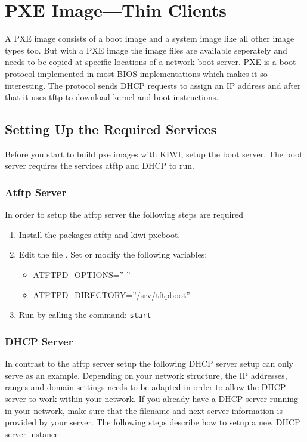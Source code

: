 \chapter{PXE Image---Thin Clients}
\label{chapter:pxe}
\minitoc

A PXE image consists of a boot image and a system image like all other
image types too. But with a PXE image the image files are available
seperately and needs to be copied at specific locations of a network
boot server. PXE is a boot protocol implemented in most BIOS implementations
which makes it so interesting. The protocol sends DHCP requests to assign
an IP address and after that it uses tftp to download kernel and boot
instructions. 

\section{Setting Up the Required Services}

Before you start to build pxe images with KIWI, setup the boot server. 
The boot server requires the services atftp and DHCP to run.

\subsection{Atftp Server}

In order to setup the atftp server the following steps are required

\begin{enumerate}
\item Install the packages atftp and kiwi-pxeboot.
\item Edit the file . Set or modify the following
      variables:
      \begin{itemize}
      \item ATFTPD\_OPTIONS='' ''
      \item ATFTPD\_DIRECTORY=''/srv/tftpboot''
      \end{itemize}
\item Run  by calling the command:
       \texttt{start}
\end{enumerate}

\subsection{DHCP Server}
In contrast to the atftp server setup the following DHCP server setup
can only serve as an example. Depending on your network structure,
the IP addresses, ranges and domain settings needs to be adapted
in order to allow the DHCP server to work within your network. If you
already have a DHCP server running in your network, make sure
that the filename and next-server information is provided by your server.
The following steps describe how to setup a new DHCP server instance:

